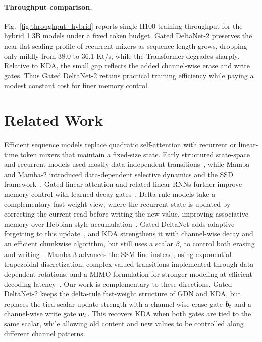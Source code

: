 \documentclass[10pt, logo, onecolumn, copyright]{nv}
\begin{document}
\paragraph{Throughput comparison.}

Fig.~\ref{fig:throughput_hybrid} reports single H100 training throughput for the hybrid 1.3B models under a fixed token budget. Gated DeltaNet-2 preserves the near-flat scaling profile of recurrent mixers as sequence length grows, dropping only mildly from 38.0 to 36.1 Kt/s, while the Transformer degrades sharply. Relative to KDA, the small gap reflects the added channel-wise erase and write gates. Thus Gated DeltaNet-2 retains practical training efficiency while paying a modest constant cost for finer memory control.

\section{Related Work}
\label{sec_related_work}

Efficient sequence models replace quadratic self-attention with recurrent or linear-time token mixers that maintain a fixed-size state. Early structured state-space and recurrent models used mostly data-independent transitions~\citep{s4,s5,Orvieto2023ResurrectingRN,sun2023retentive}, while Mamba and Mamba-2 introduced data-dependent selective dynamics and the SSD framework~\citep{gu_mamba_2023,pmlr-v235-dao24a}. Gated linear attention and related linear RNNs further improve memory control with learned decay gates~\citep{yang_gated_2023,qin2024hgrn2}. Delta-rule models take a complementary fast-weight view, where the recurrent state is updated by correcting the current read before writing the new value, improving associative memory over Hebbian-style accumulation~\citep{Gardner1988TheSO,Prados1989NeuralNC,irie2021going,yang2024parallelizing}. Gated DeltaNet adds adaptive forgetting to this update~\citep{yang2025gated}, and KDA strengthens it with channel-wise decay and an efficient chunkwise algorithm, but still uses a scalar $\beta_t$ to control both erasing and writing~\citep{team2025kimi}. Mamba-3 advances the SSM line instead, using exponential-trapezoidal discretization, complex-valued transitions implemented through data-dependent rotations, and a MIMO formulation for stronger modeling at efficient decoding latency~\citep{lahoti2026mamba3}. Our work is complementary to these directions. Gated DeltaNet-2 keeps the delta-rule fast-weight structure of GDN and KDA, but replaces the tied scalar update strength with a channel-wise erase gate ${\bm{b}}_t$ and a channel-wise write gate ${\bm{w}}_t$. This recovers KDA when both gates are tied to the same scalar, while allowing old content and new values to be controlled along different channel patterns.
\end{document}
